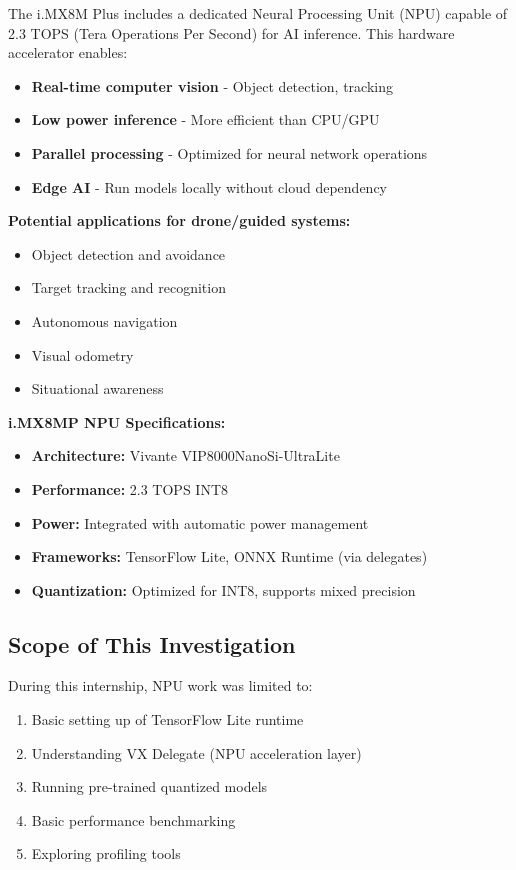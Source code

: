\documentclass[12pt,a4paper]{report}
\begin{document}
The i.MX8M Plus includes a dedicated Neural Processing Unit (NPU) capable of 2.3 TOPS (Tera Operations Per Second) for AI inference. This hardware accelerator enables:

\begin{itemize}
    \item \textbf{Real-time computer vision} - Object detection, tracking
    \item \textbf{Low power inference} - More efficient than CPU/GPU
    \item \textbf{Parallel processing} - Optimized for neural network operations
    \item \textbf{Edge AI} - Run models locally without cloud dependency
\end{itemize}

\textbf{Potential applications for drone/guided systems:}
\begin{itemize}
    \item Object detection and avoidance
    \item Target tracking and recognition
    \item Autonomous navigation
    \item Visual odometry
    \item Situational awareness
\end{itemize}

\begin{hardware}
\textbf{i.MX8MP NPU Specifications:}
\begin{itemize}
    \item \textbf{Architecture:} Vivante VIP8000NanoSi-UltraLite
    \item \textbf{Performance:} 2.3 TOPS INT8
    \item \textbf{Power:} Integrated with automatic power management
    \item \textbf{Frameworks:} TensorFlow Lite, ONNX Runtime (via delegates)
    \item \textbf{Quantization:} Optimized for INT8, supports mixed precision
\end{itemize}
\end{hardware}

\subsection{Scope of This Investigation}

During this internship, NPU work was limited to:
\begin{enumerate}
    \item Basic setting up of TensorFlow Lite runtime
    \item Understanding VX Delegate (NPU acceleration layer)
    \item Running pre-trained quantized models
    \item Basic performance benchmarking
    \item Exploring profiling tools
\end{enumerate}
\end{document}
